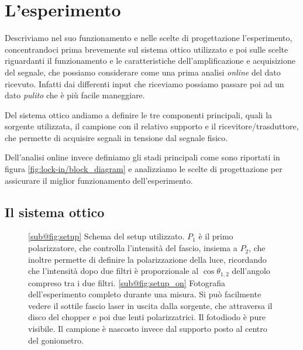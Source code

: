 \documentclass[
    prb,altaffilletter,citeautoscript,
    amsmath,amssymb,
    showpacs,showkeys,floatfix,
    reprint
]{revtex4-1}
\begin{document}
\section{L'esperimento}

Descriviamo nel suo funzionamento e nelle scelte di progettazione l'esperimento, concentrandoci prima brevemente sul sistema ottico utilizzato e poi sulle scelte riguardanti il funzionamento e le caratteristiche dell'amplificazione e acquisizione del segnale, che possiamo considerare come una prima analisi \emph{online} del dato ricevuto. Infatti dai differenti input che riceviamo possiamo passare poi ad un dato \emph{pulito} che è più facile maneggiare. 

Del sistema ottico andiamo a definire le tre componenti principali, quali la sorgente utilizzata, il campione con il relativo supporto e il ricevitore/trasduttore, che permette di acquisire segnali in tensione dal segnale fisico. 

Dell'analisi online invece definiamo gli stadi principali come sono riportati in figura \ref{fig:lock-in/block_diagram} e analizziamo le scelte di progettazione per assicurare il miglior funzionamento dell'esperimento. 

\subsection{Il sistema ottico}

\begin{figure}
    \centering
    \caption{\ref{sub@fig:setup} Schema del setup utilizzato. $P_1$ è il primo polarizzatore, che controlla l'intensità del fascio, insiema a $P_2$, che inoltre permette di definire la polarizzazione della luce, ricordando che l'intensità dopo due filtri è proporzionale al $\cos\theta_{1,2}$ dell'angolo compreso tra i due filtri. \ref{sub@fig:setup_on} Fotografia dell'esperimento completo durante una misura. Si può facilmente vedere il sottile fascio laser in uscita dalla sorgente, che attraversa il disco del chopper e poi due lenti polarizzatrici. Il fotodiodo è pure visibile. Il campione è nascosto invece dal supporto posto al centro del goniometro. }
    \label{fig:setup_and_photo}
\end{figure}
\end{document}

